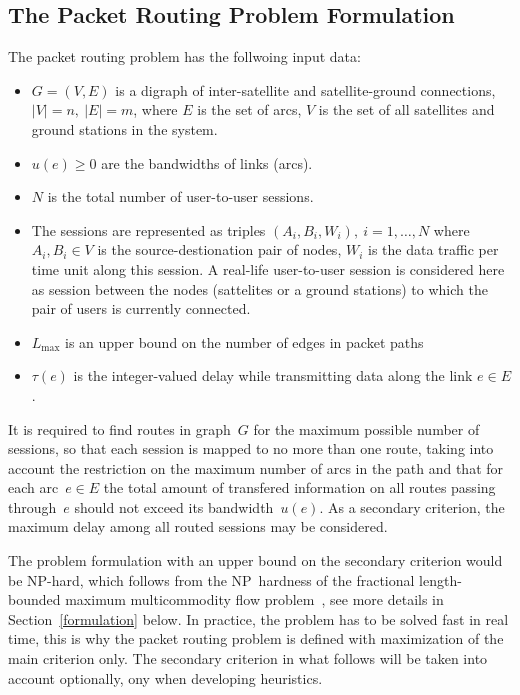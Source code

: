 \documentclass{ifacconf}
\begin{document}
\subsection{The Packet Routing Problem Formulation} \label{routing_formulation}

The packet routing problem has the follwoing input data:
\begin{itemize}
 \item $G = (V,E)$ is a digraph of inter-satellite and satellite-ground connections, $|V|=n, \ |E|=m$, where $E$ is the set of arcs, $V$ is the set of all satellites and ground stations in the system. 
 \item $u(e)\ge 0$ are the bandwidths of links (arcs).
 \item $N$ is the total number of user-to-user sessions.
 \item The sessions are represented as triples $(A_i,B_i,W_i), \ i=1,\dots,N$ where
$A_i, B_i \in V$ is the source-destionation pair of nodes, $W_i$ is the data traffic per time unit along this session. A real-life user-to-user session is considered here as session between the nodes (sattelites or a ground stations) to which the pair of users is currently 
connected. 
\item $L_{\max}$ is an upper bound on the number of edges in packet paths 
 \item $\tau(e)$ is the integer-valued delay while transmitting data along the link $e\in E$.
 \end{itemize}

It is required  to find routes in graph~$G$ for the maximum possible number of sessions, 
so that each session is mapped to no more than one route,
taking into account the restriction on the maximum number of arcs in the path and  that for each arc~$e\in E$ the total amount of transfered
information on all routes passing through~$e$ should  not exceed its bandwidth~$u(e)$.
As a secondary criterion, the maximum delay among all routed sessions may be considered.


 The problem formulation with an upper bound on the
secondary criterion would be NP-hard, which follows from
the NP~hardness of the fractional length-bounded maximum
multicommodity flow problem~\cite{Baier03}, see more details
in Section~\ref{formulation} below. In practice, the problem has to be
solved fast in real time,  this is why the packet routing problem is defined with maximization of the main criterion only.
The secondary criterion in what follows will be
taken into account optionally, ony when developing
heuristics.
\end{document}
